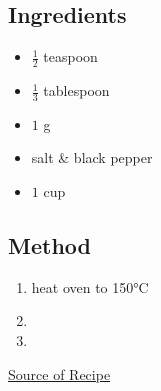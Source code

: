 \documentclass[11pt,a4paper]{article}
\begin{document}
\subsection*{Ingredients}

\begin{multicols}{2}

\begin{itemize}
  \item $ \frac{1}{2} $ teaspoon
  \item $ \frac{1}{3} $ tablespoon
  \item $ 1 $ \si{\gram}
  \item salt \& black pepper

\end{itemize}

\columnbreak

\begin{itemize}
  \item $ 1 $ cup
\end{itemize}

\end{multicols}

\medskip

\subsection*{Method}

\begin{enumerate}
  \item heat oven to 150\si{\celsius}
  \item \lipsum[2]
  \item \lipsum[3]
\end{enumerate}

\href{https://en.wikipedia.org/wiki/Recipe}{Source of Recipe}
\end{document}
